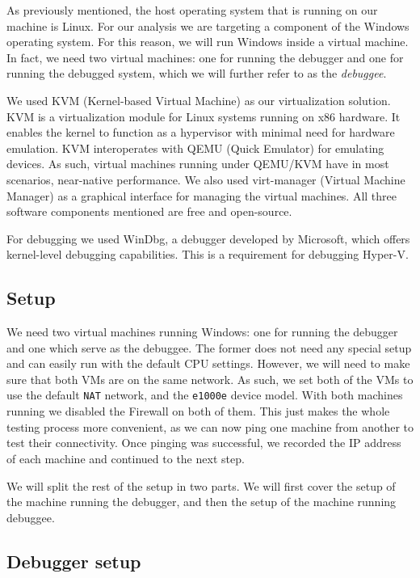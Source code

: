 \documentclass[runningheads]{llncs}
\newcommand{\cc}{\lstinline[mathescape]}
\begin{document}
As previously mentioned, the host operating system that is running on our
machine is Linux. For our analysis we are targeting a component of the Windows
operating system. For this reason, we will run Windows inside a virtual
machine. In fact, we need two virtual machines: one for running the debugger
and one for running the debugged system, which we will further refer to as the
\emph{debuggee}.

We used KVM (Kernel-based Virtual Machine) \cite{kvm} as our virtualization
solution. KVM is a virtualization module for Linux systems running on x86
hardware. It enables the kernel to function as a hypervisor with minimal need
for hardware emulation. KVM interoperates with QEMU (Quick Emulator) for
emulating devices. As such, virtual machines running under QEMU/KVM have in
most scenarios, near-native performance. We also used virt-manager (Virtual
Machine Manager) \cite{virt-manager} as a graphical interface for managing the
virtual machines. All three software components mentioned are free and
open-source.

For debugging we used WinDbg, a debugger developed by Microsoft, which offers
kernel-level debugging capabilities. This is a requirement for debugging
Hyper-V.

\subsection{Setup}

We need two virtual machines running Windows: one for running the debugger and
one which serve as the debuggee. The former does not need any special setup and
can easily run with the default CPU settings. However, we will need to make
sure that both VMs are on the same network. As such, we set both of the VMs to
use the default \cc{NAT} network, and the \cc{e1000e} device model. With both
machines running we disabled the Firewall on both of them. This just makes the
whole testing process more convenient, as we can now ping one machine from
another to test their connectivity. Once pinging was successful, we recorded the
IP address of each machine and continued to the next step.

We will split the rest of the setup in two parts. We will first cover the setup 
of the machine running the debugger, and then the setup of the machine running debuggee.

\subsection{Debugger setup}
\end{document}
